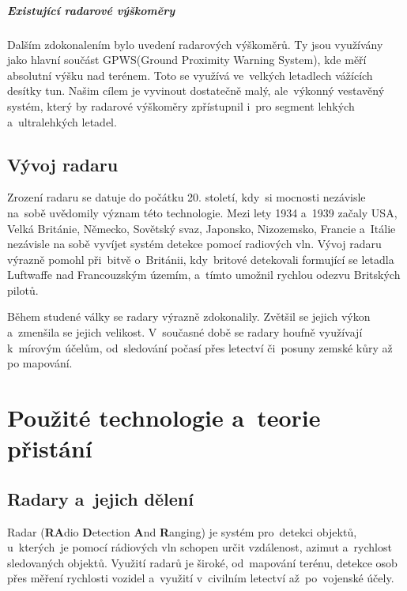 		\paragraph{Existující radarové výškoměry}
		Dalším zdokonalením bylo uvedení radarových výškoměrů. Ty jsou využívány jako hlavní součást GPWS(Ground Proximity Warning System), kde měří absolutní výšku nad terénem. Toto se využívá ve~velkých letadlech vážících desítky tun. Našim cílem je vyvinout dostatečně malý, ale~výkonný vestavěný systém, který by radarové výškoměry zpřístupnil i~pro segment lehkých a~ultralehkých letadel.
	
	\section{Vývoj radaru}
		Zrození radaru se datuje do počátku 20. století, kdy~si mocnosti nezávisle na~sobě uvědomily význam této technologie. Mezi lety 1934 a~1939 začaly USA, Velká Británie, Německo, Sovětský svaz, Japonsko, Nizozemsko, Francie a~Itálie nezávisle na sobě vyvíjet systém detekce pomocí radiových vln\cite{history::radar}. Vývoj radaru výrazně pomohl při~bitvě o~Británii, kdy~britové detekovali formující se letadla Luftwaffe nad Francouzským územím, a~tímto umožnil rychlou odezvu Britských pilotů.\par
			
		Během studené války se radary výrazně zdokonalily. Zvětšil se jejich výkon a~zmenšila se jejich velikost. V~současné době se radary houfně využívají k~mírovým účelům, od~sledování počasí přes letectví či~posuny zemské kůry až po mapování.
		
\chapter{Použité technologie a~teorie přistání}
	
	\section{Radary a~jejich dělení}\label{uvod::radary}
		Radar (\textbf{RA}dio \textbf{D}etection \textbf{A}nd \textbf{R}anging) je systém pro~detekci objektů, u~kterých~je pomocí rádiových vln schopen určit vzdálenost, azimut a~rychlost sledovaných objektů. Využití radarů je široké, od~mapování terénu, detekce osob přes měření rychlosti vozidel a~využití v~civilním letectví až~po~vojenské účely.	
			
